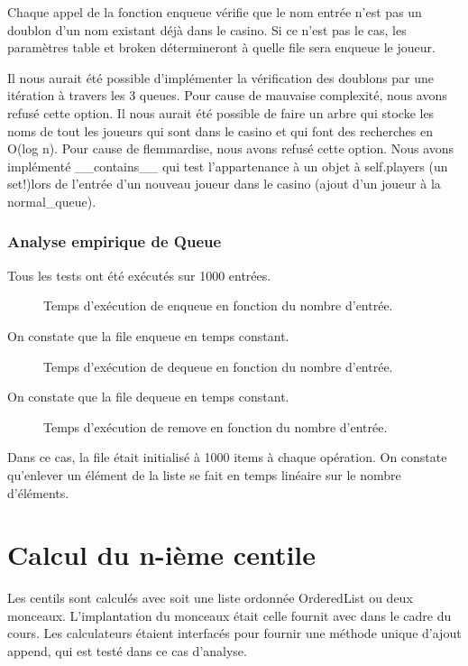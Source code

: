 \documentclass[french]{article}
\begin{document}
Chaque appel de la fonction enqueue vérifie que le nom entrée n'est pas un
doublon d'un nom existant déjà dans le casino. Si ce n'est pas le cas, les
paramètres table et broken détermineront à quelle file sera enqueue le joueur.

Il nous aurait été possible d'implémenter la vérification des doublons par une
itération à travers les 3 queues. Pour cause de mauvaise complexité, nous
avons refusé cette option. Il nous aurait été possible de faire un arbre qui
stocke les noms de tout les joueurs qui sont dans le casino et qui font des
recherches en O(log n). Pour cause de flemmardise, nous avons refusé cette
option. Nous avons implémenté \textsf{\_\_contains\_\_} qui test l'appartenance à un
objet à self.players (un set!)lors de l'entrée d'un nouveau joueur dans le
casino (ajout d'un joueur à la normal\_queue).

\subsubsection{Analyse empirique de \textsf{Queue}}
Tous les tests ont été exécutés sur 1000 entrées.

\begin{figure}
  \centering
  
  \caption{Temps d'exécution de \textsf{enqueue} en fonction du nombre d'entrée.}
\end{figure}
On constate que la file enqueue en temps constant.

\begin{figure}
  \centering
  
  \caption{Temps d'exécution de \textsf{dequeue} en fonction du nombre d'entrée.}
\end{figure}
On constate que la file dequeue en temps constant.

\begin{figure}
  \centering
  
  \caption{Temps d'exécution de \textsf{remove} en fonction du nombre d'entrée.}
\end{figure}
Dans ce cas, la file était initialisé à 1000 items à chaque opération. On
constate qu'enlever un élément de la liste se fait en temps linéaire sur le
nombre d'éléments.

\section{Calcul du n-ième centile}
Les centils sont calculés avec soit une liste ordonnée \textsf{OrderedList} ou
deux monceaux. L'implantation du monceaux était celle fournit avec dans le cadre
du cours. Les calculateurs étaient interfacés pour fournir une méthode unique
d'ajout \textsf{append}, qui est testé dans ce cas d'analyse.
\end{document}

